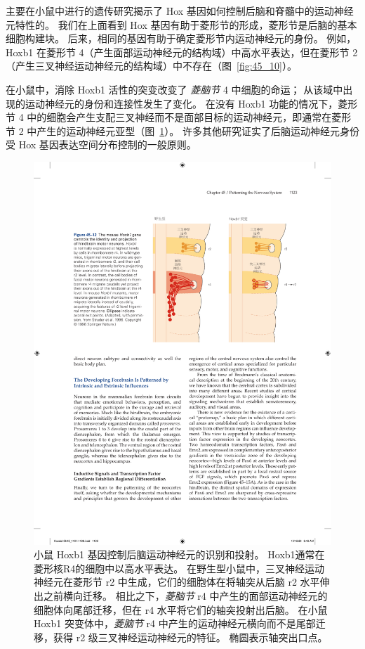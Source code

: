 主要在小鼠中进行的遗传研究揭示了 Hox 基因如何控制后脑和脊髓中的运动神经元特性的。
我们在上面看到 Hox 基因有助于菱形节的形成，菱形节是后脑的基本细胞构建块。
后来，相同的基因有助于确定菱形节内运动神经元的身份。
例如，Hoxb1 在菱形节 4（产生面部运动神经元的结构域）中高水平表达，但在菱形节 2（产生三叉神经运动神经元的结构域）中不存在（图~\ref{fig:45_10}）。


在小鼠中，消除 Hoxb1 活性的突变改变了 \textit{菱脑节} 4 中细胞的命运；
从该域中出现的运动神经元的身份和连接性发生了变化。 
在没有 Hoxb1 功能的情况下，菱形节 4 中的细胞会产生支配三叉神经而不是面部目标的运动神经元，即通常在菱形节 2 中产生的运动神经元亚型（图~\ref{fig:45_12}）。
许多其他研究证实了后脑运动神经元身份受 Hox 基因表达空间分布控制的一般原则。


\begin{figure}[htbp]
	\centering
	\includegraphics[width=0.79\linewidth]{chap45/fig_45_12}
	\caption{小鼠 Hoxb1 基因控制后脑运动神经元的识别和投射。
		Hoxb1通常在菱形核R4的细胞中以高水平表达。
		在野生型小鼠中，三叉神经运动神经元在菱形节 r2 中生成，它们的细胞体在将轴突从后脑 r2 水平伸出之前横向迁移。
		相比之下，\textit{菱脑节} r4 中产生的面部运动神经元的细胞体向尾部迁移，但在 r4 水平将它们的轴突投射出后脑。
		在小鼠 Hoxb1 突变体中，\textit{菱脑节} r4 中产生的运动神经元横向而不是尾部迁移，获得 r2 级三叉神经运动神经元的特征。
		椭圆表示轴突出口点\cite{studer1996altered}。}
	\label{fig:45_12}
\end{figure}



